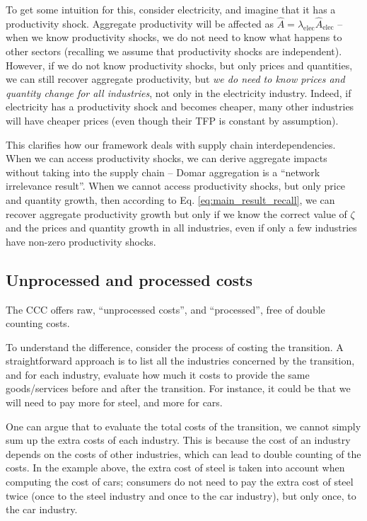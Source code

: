 \documentclass[11pt]{article}
\begin{document}
To get some intuition for this, consider electricity, and imagine that it has a productivity shock. Aggregate productivity will be affected as $\hat{A} = \lambda_{\text{elec}} \hat{A}_{\text{elec}}$ \--- when we know productivity shocks, we do not need to know what happens to other sectors (recalling we assume that productivity shocks are independent). However, if we do not know productivity shocks, but only prices and quantities, we can still recover aggregate productivity, but \textit{we do need to know prices and quantity change for all industries}, not only in the electricity industry. Indeed, if electricity has a productivity shock and becomes cheaper, many other industries will have cheaper prices (even though their TFP is constant by assumption).

This clarifies how our framework deals with supply chain interdependencies. When we can access productivity shocks, we can derive aggregate impacts  without taking into the supply chain \--- Domar aggregation is a ``network irrelevance result''. When we cannot access productivity shocks, but only price and quantity growth, then according to Eq. \ref{eq:main_result_recall}, we can recover aggregate productivity growth but only if we know the correct value of $\zeta$ and the prices and quantity growth in all industries, even if only a few industries have non-zero productivity shocks.


\subsection{Unprocessed and processed costs}

The CCC offers raw, ``unprocessed costs'', and ``processed'', free of double counting costs.

To understand the difference, consider the process of costing the transition. A straightforward approach is to list all the industries concerned by the transition, and for each industry, evaluate how much it costs to provide the same goods/services before and after the transition. For instance, it could be that we will need to pay more for steel, and more for cars.

One can argue that to evaluate the total costs of the transition, we cannot simply sum up the extra costs of each industry. This is because the cost of an industry depends on the costs of other industries, which can lead to double counting of the costs. In the example above, the extra cost of steel is taken into account when computing the cost of cars; consumers do not need to pay the extra cost of steel twice (once to the steel industry and once to the car industry), but only once, to the car industry.
\end{document}
